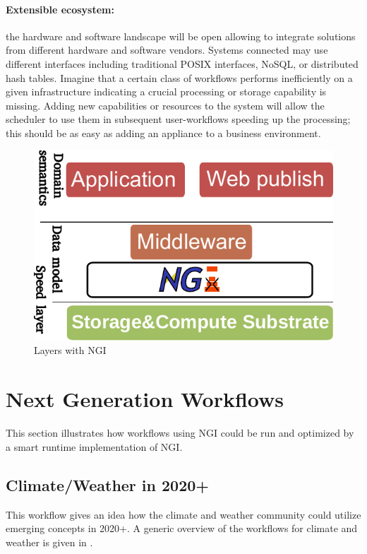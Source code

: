 \documentclass[a4paper, twocolumn]{article}
\begin{document}
\paragraph{Extensible ecosystem:}
the hardware and software landscape will be open allowing to integrate solutions from different hardware and software vendors.
Systems connected may use different interfaces including traditional POSIX interfaces, NoSQL, or distributed hash tables.
Imagine that a certain class of workflows performs inefficiently on a given infrastructure indicating a crucial processing or storage capability is missing.
Adding new capabilities or resources to the system will allow the scheduler to use them in subsequent user-workflows speeding up the processing; this should be as easy as adding an appliance to a business environment.



\begin{figure}[b]
  \centering
  \includegraphics[width=0.75\columnwidth]{layers-ngi}
  \caption{Layers with NGI}
  \label{fig:ngilayers}
\end{figure}


\section{Next Generation Workflows}
\label{sec:ngWorkflows}

This section illustrates how workflows using NGI could be run and optimized by a smart runtime implementation of NGI.


\subsection{Climate/Weather in 2020+}

This workflow gives an idea how the climate and weather community could utilize emerging concepts in 2020+.
A generic overview of the workflows for climate and weather is given in .
\end{document}
